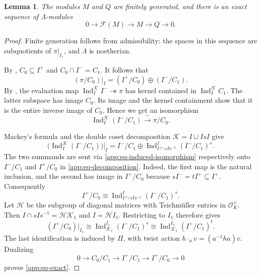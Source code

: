 \documentclass[11pt]{article}
\numberwithin{equation}{section}
\newtheorem{lemma}[theorem]{Lemma}
\theoremstyle{definition}
\theoremstyle{remark}
\newcommand{\cO}{\mathcal O}
\begin{document}
\begin{cbunit}
\begin{lemma}\label{app:lem-exact}
The modules $M$ and $Q$ are finitely generated, and there is an
exact sequence of $\Lambda$-modules
\begin{equation}\label{app:eq-exact}
 0\longrightarrow\mathcal F(M)\longrightarrow M
   \longrightarrow Q\longrightarrow0.
\end{equation}
\end{lemma}

\begin{proof}
Finite generation follows from admissibility: the spaces in this
sequence are subquotients of $\pi|_{I_1}$, and $\Lambda$ is
noetherian.

By \cite[Lem.~3.4]{Hu12}, $C_0\subseteq I^+$ and $C_0\cap I^-=C_1$.
It follows that
\begin{equation}\label{app:eq-decomposition}
 (\pi/C_0)|_I=(I^+/C_0)\oplus(I^-/C_1).
\end{equation}
By \cite[\S~3.1.1, preceding Lem.~3.1]{Hu12}, the evaluation map
$\operatorname{Ind}_I^{\mathcal K}I^-\twoheadrightarrow\pi$
has kernel contained in $\operatorname{Ind}_I^{\mathcal K}C_1$.
The latter subspace has image $C_0$. Its image and the kernel
containment show that it is the entire inverse image of $C_0$.
Hence we get an isomorphism
\begin{equation}\label{app:eq-induced-isomorphism}
 \operatorname{Ind}_I^{\mathcal K}(I^-/C_1)
       \xrightarrow{\ \sim\ }\pi/C_0.
\end{equation}

Mackey's formula and the double coset decomposition
$\mathcal K=I\sqcup IsI$ give
\[
 \bigl(\operatorname{Ind}_I^{\mathcal K}(I^-/C_1)\bigr)|_I
 =I^-/C_1\oplus
       \operatorname{Ind}_{I\cap sIs^{-1}}^I(I^-/C_1)^s.
\]
The two summands are sent via
\eqref{app:eq-induced-isomorphism} respectively onto $I^-/C_1$
and $I^+/C_0$ in \eqref{app:eq-decomposition}. Indeed, the first
map is the natural inclusion, and the second has image in
$I^+/C_0$ because $sI^-=tI^+\subseteq I^+$. Consequently
\[
 I^+/C_0\cong\operatorname{Ind}_{I\cap sIs^{-1}}^I(I^-/C_1)^s.
\]
Let $\mathcal  H$ be the subgroup of diagonal matrices with
Teichm\"uller entries in $\cO_K^\times$. Then
$I\cap sIs^{-1}=\mathcal  H\mathcal K_1$ and $I=\mathcal  H I_1$.
Restricting to $I_1$ therefore gives
\[
 (I^+/C_0)|_{I_1}
 \cong\operatorname{Ind}_{\mathcal K_1}^{I_1}(I^-/C_1)^s
 \cong\operatorname{Ind}_{\mathcal K_1}^{I_1}(I^+/C_1)^t.
\]
The last identification is induced by $\Pi$, with twist action
$h\cdot_a v=(a^{-1}ha)v$. Dualizing
\[
 0\longrightarrow C_0/C_1\longrightarrow I^+/C_1
   \longrightarrow I^+/C_0\longrightarrow0
\]
proves \eqref{app:eq-exact}.
\end{proof}


\end{cbunit}
\end{document}
